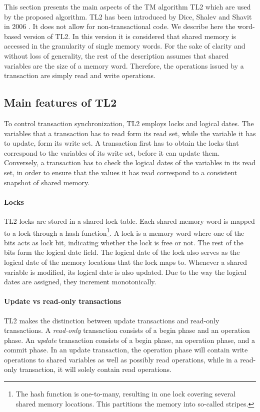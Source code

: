 \documentclass[11pt,letterpaper]{article}
\begin{document}
This section presents the main  aspects of the  TM algorithm TL2  which  are  
used by the proposed algorithm. TL2 has been introduced by Dice, Shalev and Shavit 
in    2006    \cite{dice06}.   It does not allow for  non-transactional code.  We describe 
here the word-based version of TL2. In this  version it is considered that shared  memory 
is accessed in the granularity of  single  memory words.  For the sake of  clarity and without 
loss  of generality, the rest of the description  assumes that shared variables are the size of a 
memory word. Therefore,  the operations issued by a transaction are simply read and write operations.  



\subsection{Main features of TL2}
To control transaction synchronization, TL2 employs locks and 
logical dates. The variables  that a  transaction has to read form its read
set, while the variable it has to update, form its write set.  
A  transaction  first  has to  obtain  the  locks  that correspond  to  the
variables of its write set, before it can  
update them.  Conversely, a  transaction has to  check the logical dates  of the
variables in its read set, in  
order to  ensure that  the values  it has read  correspond to  a consistent
snapshot of shared memory.  


\paragraph{Locks}
TL2 locks  are stored in  a shared lock  table. Each shared memory  word is
mapped to a lock through a  
hash function\footnote{The  hash function is one-to-many,  resulting in one
lock covering several shared  
memory locations. This  partitions the memory into  so-called stripes.}. A
lock is a memory word where  
one of the  bits acts as lock  bit, indicating whether the lock  is free or
not. The rest of the bits form the  
logical date field.  The logical date of the lock  also serves as the 
logical date of the
memory  locations that  the lock  maps to.  Whenever a  shared  variable is
modified, its logical date is also updated. Due to the way the  
logical dates are assigned, they increment monotonically. 

\paragraph{Update vs read-only transactions}
TL2  makes  the  distinction  between  update  transactions  and  read-only
transactions. A {\it read-only} 
transaction consists  of a  begin phase and  an operation phase.  
An {\it update}  transaction consists  
of a  begin phase,  an operation phase,  and a  commit phase. In  an update
transaction, the operation  
phase will contain write operations to shared variables as well as possibly
read operations, while  
in a  read-only transaction, it  will solely contain read  operations. 
\end{document}
